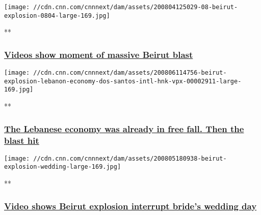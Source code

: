 \href{/videos/world/2020/08/04/beirut-explosion-moment-of-blast-witness-ctw-vpx.cnn/video/playlists/beirut-explosion/}{}

\texttt{[image: //cdn.cnn.com/cnnnext/dam/assets/200804125029-08-beirut-explosion-0804-large-169.jpg]}

**

\hypertarget{videos-show-moment-of-massive-beirut-blast}{%
\subsubsection{\texorpdfstring{\href{/videos/world/2020/08/04/beirut-explosion-moment-of-blast-witness-ctw-vpx.cnn/video/playlists/beirut-explosion/}{Videos
show moment of massive Beirut
blast}}{Videos show moment of massive Beirut blast}}\label{videos-show-moment-of-massive-beirut-blast}}

\href{/videos/business/2020/08/06/beirut-explosion-lebanon-economy-dos-santos-intl-hnk-vpx.cnn/video/playlists/beirut-explosion/}{}

\texttt{[image: //cdn.cnn.com/cnnnext/dam/assets/200806114756-beirut-explosion-lebanon-economy-dos-santos-intl-hnk-vpx-00002911-large-169.jpg]}

**

\hypertarget{the-lebanese-economy-was-already-in-free-fall-then-the-blast-hit}{%
\subsubsection{\texorpdfstring{\href{/videos/business/2020/08/06/beirut-explosion-lebanon-economy-dos-santos-intl-hnk-vpx.cnn/video/playlists/beirut-explosion/}{The
Lebanese economy was already in free fall. Then the blast
hit}}{The Lebanese economy was already in free fall. Then the blast hit}}\label{the-lebanese-economy-was-already-in-free-fall-then-the-blast-hit}}

\href{/videos/world/2020/08/05/beirut-explosion-wedding-video-zw-orig.cnn/video/playlists/beirut-explosion/}{}

\texttt{[image: //cdn.cnn.com/cnnnext/dam/assets/200805180938-beirut-explosion-wedding-large-169.jpg]}

**

\hypertarget{video-shows-beirut-explosion-interrupt-brides-wedding-day}{%
\subsubsection{\texorpdfstring{\href{/videos/world/2020/08/05/beirut-explosion-wedding-video-zw-orig.cnn/video/playlists/beirut-explosion/}{Video
shows Beirut explosion interrupt bride's wedding
day}}{Video shows Beirut explosion interrupt bride's wedding day}}\label{video-shows-beirut-explosion-interrupt-brides-wedding-day}}

